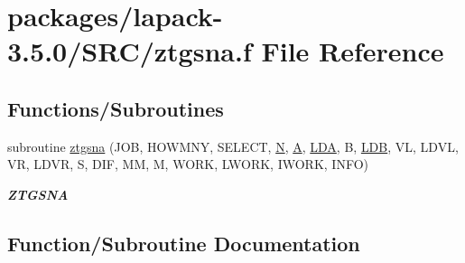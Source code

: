 \hypertarget{ztgsna_8f}{}\section{packages/lapack-\/3.5.0/\+S\+R\+C/ztgsna.f File Reference}
\label{ztgsna_8f}
\subsection*{Functions/\+Subroutines}
\begin{DoxyCompactItemize}
\item 
subroutine \hyperlink{ztgsna_8f_a7dbbe62862cb79387b6d3575ffcb68ea}{ztgsna} (J\+O\+B, H\+O\+W\+M\+N\+Y, S\+E\+L\+E\+C\+T, \hyperlink{polmisc_8c_a0240ac851181b84ac374872dc5434ee4}{N}, \hyperlink{classA}{A}, \hyperlink{example__user_8c_ae946da542ce0db94dced19b2ecefd1aa}{L\+D\+A}, B, \hyperlink{example__user_8c_a50e90a7104df172b5a89a06c47fcca04}{L\+D\+B}, V\+L, L\+D\+V\+L, V\+R, L\+D\+V\+R, S, D\+I\+F, M\+M, M, W\+O\+R\+K, L\+W\+O\+R\+K, I\+W\+O\+R\+K, I\+N\+F\+O)
\begin{DoxyCompactList}\small\item\em {\bfseries Z\+T\+G\+S\+N\+A} \end{DoxyCompactList}\end{DoxyCompactItemize}


\subsection{Function/\+Subroutine Documentation}
\hypertarget{ztgsna_8f_a7dbbe62862cb79387b6d3575ffcb68ea}{}
